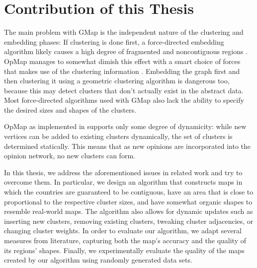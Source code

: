 \section{Contribution of this Thesis}
\label{sect:structure-of-this-thesis}

The main problem with GMap is the independent nature of the clustering and embedding phases:
If clustering is done first, a force-directed embedding algorithm likely causes a high degree of fragmented and noncontiguous regions \cite{mashima2011visualizing}.
OpMap manages to somewhat dimish this effect with a smart choice of forces that makes use of the clustering information \cite{schmettow2017}.
Embedding the graph first and then clustering it using a geometric clustering algorithm is dangerous too, because this may detect clusters that don't actually exist in the abstract data.
Most force-directed algorithms used with GMap also lack the ability to specify the desired sizes and shapes of the clusters.

OpMap as implemented in \cite{schmettow2017} supports only some degree of dynamicity: while new vertices can be added to existing clusters dynamically, the set of clusters is determined statically.
This means that as new opinions are incorporated into the opinion network, no new clusters can form.

In this thesis, we address the aforementioned issues in related work and try to overcome them.
In particular, we design an algorithm that constructs maps in which the countries are guaranteed to be contiguous, have an area that is close to proportional to the respective cluster sizes, and have somewhat organic shapes to resemble real-world maps.
The algorithm also allows for dynamic updates such as inserting new clusters, removing existing clusters, tweaking cluster adjacencies, or changing cluster weights.
In order to evaluate our algorithm, we adapt several measures from literature, capturing both the map's accuracy and the quality of its regions' shapes.
Finally, we experimentally evaluate the quality of the maps created by our algorithm using randomly generated data sets.
